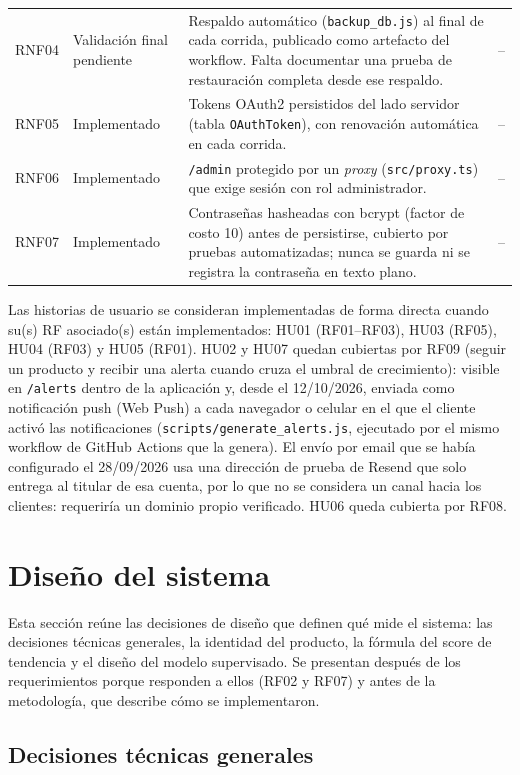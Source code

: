 \begin{longtable}{@{}>{\raggedright\arraybackslash}p{1.2cm} >{\raggedright\arraybackslash}p{2.3cm} >{\raggedright\arraybackslash}p{8.7cm} >{\raggedright\arraybackslash}p{1.9cm}@{}}
	RNF04 & Validación final pendiente & Respaldo automático (\texttt{backup\_db.js}) al final de cada corrida, publicado como artefacto del workflow. Falta documentar una prueba de restauración completa desde ese respaldo. & -- \\
	RNF05 & Implementado & Tokens OAuth2 persistidos del lado servidor (tabla \texttt{OAuthToken}), con renovación automática en cada corrida. & -- \\
	RNF06 & Implementado & \texttt{/admin} protegido por un \emph{proxy} (\texttt{src/proxy.ts}) que exige sesión con rol administrador. & -- \\
	RNF07 & Implementado & Contraseñas hasheadas con bcrypt (factor de costo 10) antes de persistirse, cubierto por pruebas automatizadas; nunca se guarda ni se registra la contraseña en texto plano. & -- \\
	\bottomrule
\end{longtable}

Las historias de usuario se consideran implementadas de forma directa cuando su(s) RF asociado(s) están implementados: HU01 (RF01--RF03), HU03 (RF05), HU04 (RF03) y HU05 (RF01). HU02 y HU07 quedan cubiertas por RF09 (seguir un producto y recibir una alerta cuando cruza el umbral de crecimiento): visible en \texttt{/alerts} dentro de la aplicación y, desde el 12/10/2026, enviada como notificación push (Web Push) a cada navegador o celular en el que el cliente activó las notificaciones (\texttt{scripts/generate\_alerts.js}, ejecutado por el mismo workflow de GitHub Actions que la genera). El envío por email que se había configurado el 28/09/2026 usa una dirección de prueba de Resend que solo entrega al titular de esa cuenta, por lo que no se considera un canal hacia los clientes: requeriría un dominio propio verificado. HU06 queda cubierta por RF08.

\section{Diseño del sistema}\label{sec:diseno-sistema}

Esta sección reúne las decisiones de diseño que definen qué mide el sistema: las decisiones técnicas generales, la identidad del producto, la fórmula del score de tendencia y el diseño del modelo supervisado. Se presentan después de los requerimientos porque responden a ellos (RF02 y RF07) y antes de la metodología, que describe cómo se implementaron.

\subsection{Decisiones técnicas generales}

